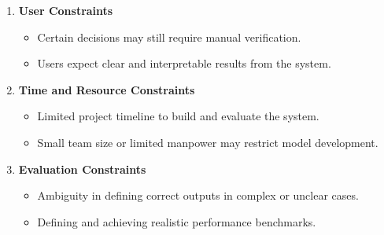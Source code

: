 \documentclass{article}
\begin{document}
\begin{enumerate}
    \item \textbf{User Constraints}
    \begin{itemize}
        \item Certain decisions may still require manual verification.
        \item Users expect clear and interpretable results from the system.
    \end{itemize}

    \item \textbf{Time and Resource Constraints}
    \begin{itemize}
        \item Limited project timeline to build and evaluate the system.
        \item Small team size or limited manpower may restrict model development.
    \end{itemize}

    \item \textbf{Evaluation Constraints}
    \begin{itemize}
        \item Ambiguity in defining correct outputs in complex or unclear cases.
        \item Defining and achieving realistic performance benchmarks.
    \end{itemize}
\end{enumerate}
\end{document}

